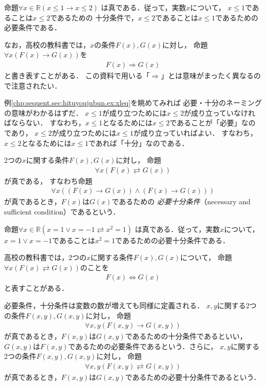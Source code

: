 \begin{ex} \label{chp:sequent.sec:hituyoujubun.ex:xleq}
   命題$\forall x \in \mathbb{R} ( x \leq 1 \to x\leq 2)$
   は真である．従って，実数$x$について，
   $x \leq 1$であることは$x \leq 2$であるための
   十分条件で，$x \leq 2$であることは$x \leq 1$であるための
   必要条件である．
 \end{ex}
 なお，高校の教科書では，$x$の条件$F(x),  G(x)$に対し，
 命題$\forall x (F(x) \to G(x) )$を
 \begin{align}
   F(x) \Longrightarrow G(x)
   \label{eq:narabakoukou}
 \end{align}
 と書き表すことがある．
 この資料で用いる「$\Longrightarrow$」とは意味がまったく異なるので注意されたい．

 例\ref{chp:sequent.sec:hituyoujubun.ex:xleq}を眺めてみれば
 必要・十分のネーミングの意味がわかるはずだ．
 $x \leq 1$が成り立つためには$x \leq 2$が成り立っていなければならない．
 すなわち，$x \leq 1$となるためには$x \leq 2$であることが「必要」なのであり，
 $x \leq 2$が成り立つためには$x \leq 1$が成り立っていればよい．
 すなわち，$x \leq 2$となるためには$x \leq 1$であれば「十分」なのである．

 2つの$x$に関する条件$F(x),  G(x)$に対し，
 命題
 \begin{align}
   \forall x ( F(x) \rightleftarrows G(x))
   \label{eq:FGdouti}
 \end{align}
 が真である，
 すなわち命題
 \begin{align}
   \forall x( (F(x) \to G(x) ) \land ( F(x) \to G(x) ))
   \label{eq:FGdouti2}
 \end{align}
 が真であるとき，$F(x)$は$G(x)$であるための
 \emph{必要十分条件}（necessary and sufficient condition）であるという．

 \begin{ex}
   命題$\forall x \in \mathbb{R} ( x= 1 \lor x = -1 \rightleftarrows x^2 =1)$
   は真である．従って，実数$x$について，
   $x =1 \lor x=-1$であることは$x^2=1$であるための必要十分条件である．
 \end{ex}

 高校の教科書では，2つの$x$に関する条件$F(x) , G(x)$について，
 命題$\forall x (F(x) \rightleftarrows G(x))$のことを
 \begin{align}
   F(x) \Longleftrightarrow G(x)
   \label{eq:FGkoukoudouti}
 \end{align}
 と表すことがある．
 
 必要条件，十分条件は変数の数が増えても同様に定義される．
 $x,y$に関する2つの条件$F(x,y),G(x,y)$に対し，
 命題
 \begin{align}
   \forall x,y ( F(x,y) \to G(x,y) )
   \label{eq:FnarabaGxy}
 \end{align}
 が真であるとき，$F(x,y)$は$G(x,y)$であるための十分条件であるといい，
 $G(x,y)$は$F(x,y)$であるための必要条件であるという．さらに，
 $x,y$に関する2つの条件$F(x,y) , G(x,y)$に対し，
 命題
 \begin{align}
   \forall x,y ( F(x,y) \rightleftarrows G(x,y))
   \label{eq:xyFGdouti}
 \end{align}
 が真であるとき，$F(x,y)$は$G(x,y)$であるための必要十分条件であるという．

